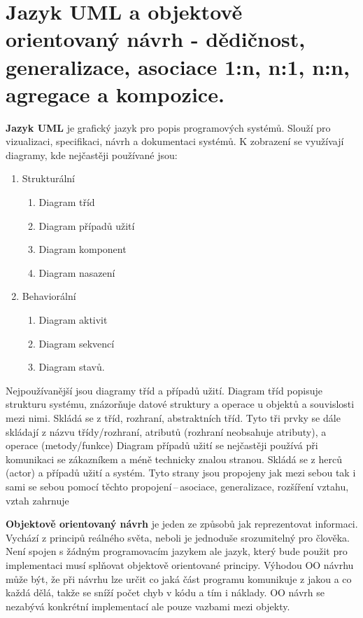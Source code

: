 \newpage
\section{Jazyk UML a objektově orientovaný návrh - dědičnost, generalizace, asociace 1:n, n:1, n:n, agregace a kompozice.}

 \textbf{Jazyk UML} je grafický jazyk pro popis programových systémů. Slouží pro vizualizaci, specifikaci, návrh a dokumentaci systémů. K zobrazení se využívají diagramy, kde nejčastěji používané jsou:
\begin{enumerate}
    \item Strukturální
    \begin{enumerate}
        \item Diagram tříd
        \item Diagram případů užití
        \item Diagram komponent
        \item Diagram nasazení
    \end{enumerate}
    \item Behaviorální
    \begin{enumerate}
        \item Diagram aktivit
        \item Diagram sekvencí
        \item Diagram stavů.
    \end{enumerate}
\end{enumerate}
Nejpoužívanější jsou diagramy tříd a případů užití. Diagram tříd popisuje strukturu systému, znázorňuje datové struktury a operace u objektů a souvislosti mezi nimi. Skládá se z tříd, rozhraní, abstraktních tříd. Tyto tři prvky se dále skládají z názvu třídy/rozhraní, atributů (rozhraní neobsahuje atributy), a operace (metody/funkce) Diagram případů užití se nejčastěji používá při komunikaci se zákazníkem a méně technicky znalou stranou. Skládá se z herců (actor) a případů užití a systém. Tyto strany jsou propojeny jak mezi sebou tak i sami se sebou pomocí těchto propojení\,--\,asociace, generalizace, rozšíření vztahu, vztah zahrnuje

\textbf{Objektově orientovaný návrh} je jeden ze způsobů jak reprezentovat informaci. Vychází z principů reálného světa, neboli je jednoduše srozumitelný pro člověka. Není spojen s žádným programovacím jazykem ale jazyk, který bude použit pro implementaci musí splňovat objektově orientované principy. Výhodou OO návrhu může být, že při návrhu lze určit co jaká část programu komunikuje z jakou a co každá dělá, takže se sníží počet chyb v kódu a tím i náklady. OO návrh se nezabývá konkrétní implementací ale pouze vazbami mezi objekty.

